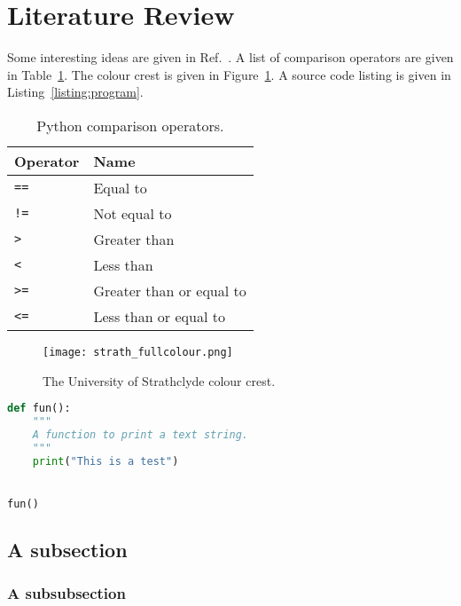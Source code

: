 
\section{Literature Review}
Some interesting ideas are given in Ref.~\cite{turing1950computing}.  A list of comparison operators are given in Table~\ref{table:comparison-operators}.  The colour crest is given in Figure~\ref{figure:colour-crest}.  A source code listing is given in Listing~\ref{listing:program}.

\begin{table}[h!!]
  \begin{center}
    \caption{Python comparison operators.}
    \label{table:comparison-operators}
    \begin{tabular}{l|l} \hline
      \textbf{Operator} & \textbf{Name}\\
      \hline
      \texttt{==} & Equal to\\
      \texttt{!=} & Not equal to\\
      \texttt{>} & Greater than\\
      \texttt{<} & Less than\\
      \texttt{>=} & Greater than or equal to\\
      \texttt{<=} & Less than or equal to\\ \hline
    \end{tabular}
  \end{center}
\end{table}

\begin{figure}[h!!]
  \begin{center}
    \texttt{[image: strath\_fullcolour.png]}
    \caption{The University of Strathclyde colour crest.}
    \label{figure:colour-crest}
  \end{center}
\end{figure}

\begin{singlespacing}
\begin{lstlisting}[language=python,caption={Demonstrating source code listing.},label=listing:program]
def fun():
    """
    A function to print a text string.
    """
    print("This is a test")


fun()
\end{lstlisting}
\end{singlespacing}

\lipsum[1-2]
\subsection{A subsection}
\lipsum[1-2]
\subsubsection{A subsubsection}
\lipsum[1-2]